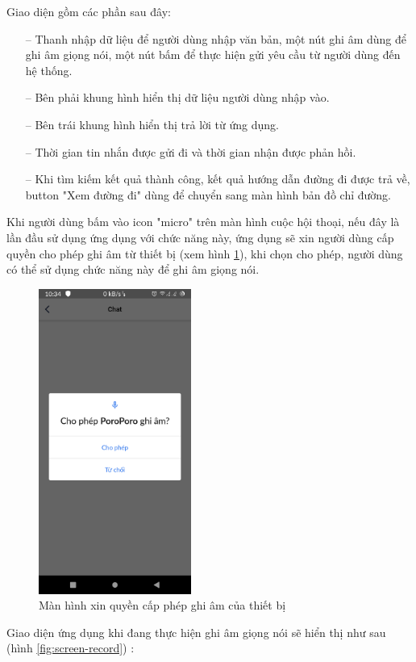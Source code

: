 Giao diện gồm các phần sau đây:
\begin{itemize}
    \item[--] Thanh nhập dữ liệu để người dùng nhập văn bản, một nút ghi âm dùng để ghi âm giọng nói, một nút bấm để thực hiện gửi yêu cầu từ người dùng đến hệ thống.
    \item[--] Bên phải khung hình hiển thị dữ liệu người dùng nhập vào.
    \item[--] Bên trái khung hình hiển thị trả lời từ ứng dụng.
    \item[--] Thời gian tin nhắn được gửi đi và thời gian nhận được phản hồi.
    \item[--] Khi tìm kiếm kết quả thành công, kết quả hướng dẫn đường đi được trả về, button "Xem đường đi" dùng để chuyển sang màn hình bản đồ chỉ đường.
\end{itemize}

Khi người dùng bấm vào icon "micro" trên màn hình cuộc hội thoại, nếu đây là lần đầu sử dụng ứng dụng với chức năng này, ứng dụng sẽ xin người dùng cấp quyền cho phép ghi âm từ thiết bị (xem hình \ref{fig: accesss-mic}), khi chọn cho phép, người dùng có thể sử dụng chức năng này để ghi âm giọng nói.

\begin{figure}[H]
    \centering
    \includegraphics[width=5cm]{images/access_mic.jpg}
    \caption{Màn hình xin quyền cấp phép ghi âm của thiết bị}
    \label{fig: accesss-mic}
\end{figure}

Giao diện ứng dụng khi đang thực hiện ghi âm giọng nói sẽ hiển thị như sau (hình \ref{fig:screen-record}) :


